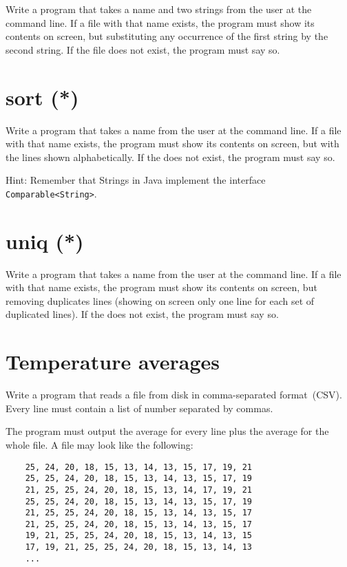 \documentclass{article}
\begin{document}
Write a program that takes a name and two strings from the user at the
command line. If a file with that name exists, the program must show
its contents on screen, but substituting any occurrence of the first
string by the second string. If the file does not exist, the program
must say so.

\section{sort (*)}
\label{sec:sort-}

Write a program that takes a name from the user at the command
line. If a file with that name exists, the program must show its
contents on screen, but with the lines shown alphabetically. If the
does not exist, the program must say so. 

Hint: Remember that Strings in Java implement the interface
\verb+Comparable<String>+. 

\section{uniq (*)}
\label{sec:uniq-}

Write a program that takes a name from the user at the command
line. If a file with that name exists, the program must show its
contents on screen, but removing duplicates lines (showing on screen 
only one line for each set of duplicated lines). If the
does not exist, the program must say so. 

\section{Temperature averages}
\label{sec:temperature-averages}

Write a program that reads a file from disk in comma-separated
format~(CSV). Every line must contain a list of number separated by
commas. 

The program must output the average for every line plus the average
for the whole file. A file may look like the following: 

\begin{verbatim}
    25, 24, 20, 18, 15, 13, 14, 13, 15, 17, 19, 21 
    25, 25, 24, 20, 18, 15, 13, 14, 13, 15, 17, 19 
    21, 25, 25, 24, 20, 18, 15, 13, 14, 17, 19, 21 
    25, 25, 24, 20, 18, 15, 13, 14, 13, 15, 17, 19 
    21, 25, 25, 24, 20, 18, 15, 13, 14, 13, 15, 17 
    21, 25, 25, 24, 20, 18, 15, 13, 14, 13, 15, 17 
    19, 21, 25, 25, 24, 20, 18, 15, 13, 14, 13, 15 
    17, 19, 21, 25, 25, 24, 20, 18, 15, 13, 14, 13
    ...
\end{verbatim}
\end{document}
